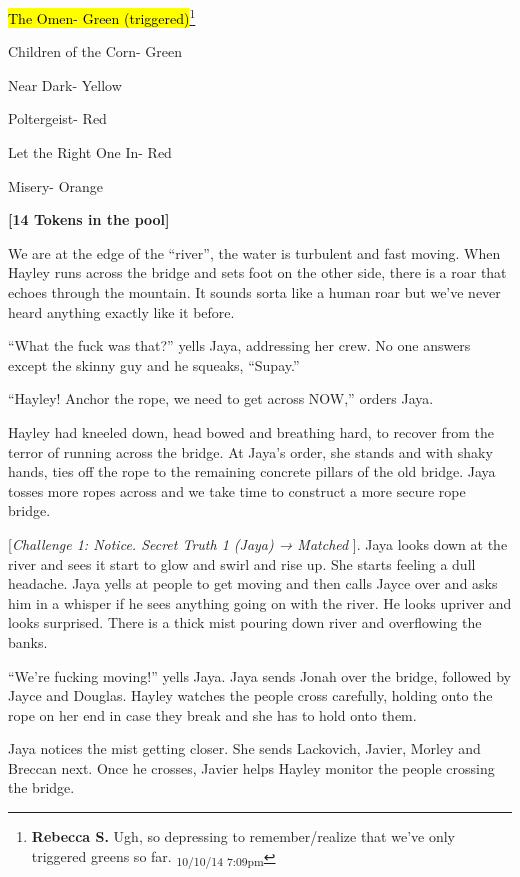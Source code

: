 
{\parskip=0pt
\hl{The Omen- Green (triggered)}\footnote{\textbf{Rebecca S. }Ugh, so depressing to remember/realize that we've only triggered greens so far. \textsubscript{10/10/14 7:09pm}}

Children of the Corn- Green

Near Dark- Yellow

Poltergeist- Red

Let the Right One In- Red

Misery- Orange
}


\textbf{{[}14 Tokens in the pool{]}}



We are at the edge of the ``river'', the water is turbulent and fast moving.  When Hayley runs across the bridge and sets foot on the other side, there is a roar that echoes through the mountain.  It sounds sorta like a human roar but we've never heard anything exactly like it before. 

``What the fuck was that?'' yells Jaya, addressing her crew.  No one answers except the skinny guy and he squeaks, ``Supay.''

``Hayley!  Anchor the rope, we need to get across NOW,'' orders Jaya.

Hayley had kneeled down, head bowed and breathing hard, to recover from the terror of running across the bridge.  At Jaya's order, she stands and with shaky hands, ties off the rope to the remaining concrete pillars of the old bridge.  Jaya tosses more ropes across and we take time to construct a more secure rope bridge. 



{[}\textit{Challenge 1: Notice.  Secret Truth 1 (Jaya) → Matched }{]}.  Jaya looks down at the river and sees it start to glow and swirl and rise up.  She starts feeling a dull headache.  Jaya yells at people to get moving and then calls Jayce over and asks him in a whisper if he sees anything going on with the river.  He looks upriver and looks surprised.  There is a thick mist pouring down river and overflowing the banks. 

``We're fucking moving!'' yells Jaya.  Jaya sends Jonah over the bridge, followed by Jayce and Douglas.   Hayley watches the people cross carefully, holding onto the rope on her end in case they break and she has to hold onto them.

Jaya notices the mist getting closer.  She sends Lackovich, Javier, Morley and Breccan next.  Once he crosses, Javier helps Hayley monitor the people crossing the bridge.  

